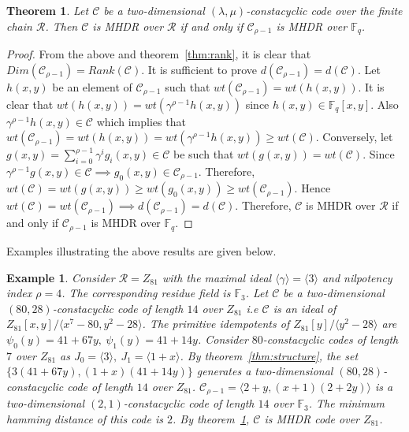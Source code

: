 \documentclass[12pt,a4paper]{article}
\newtheorem{theorem}{Theorem}[section]
\newtheorem{example}{Example}
\begin{document}
\begin{theorem}\label{thm:mhdr}
    Let $\mathscr{C}$ be a two-dimensional $(\lambda,\mu)$-constacyclic code over the finite chain $\mathcal{R}$. Then $\mathscr{C}$ is MHDR over $\mathcal{R}$ if and only if $\mathscr{C}_{\rho-1}$ is MHDR over $\mathbb{F}_q$.
\end{theorem}
\begin{proof}
    From the above and theorem~\ref{thm:rank}, it is clear that $Dim(\mathscr{C}_{\rho-1})= Rank(\mathscr{C})$. It is sufficient to prove $d(\mathscr{C}_{\rho-1})=d(\mathscr{C})$. Let $h(x,y)$ be an element of $\mathscr{C}_{\rho-1}$ such that $wt(\mathscr{C}_{\rho-1})=wt(h(x,y)).$ It is clear that $wt(h(x,y))=wt(\gamma^{\rho-1}h(x,y))$ since $h(x,y) \in \mathbb{F}_q[x,y]$. Also $\gamma^{\rho-1}h(x,y) \in \mathscr{C}$ which implies that $wt(\mathscr{C}_{\rho-1})=wt(h(x,y))=wt(\gamma^{\rho-1}h(x,y)) \geq wt(\mathscr{C}).$ Conversely, let $g(x,y)= \sum_{i=0}^{\rho-1}\gamma^i g_i(x,y) \in \mathscr{C}$ be such that $wt(g(x,y))=wt(\mathscr{C})$. Since $\gamma^{\rho-1}g(x,y) \in \mathscr{C} \implies g_0(x,y) \in \mathscr{C}_{\rho-1}$. Therefore, $wt(\mathscr{C})=wt(g(x,y)) \geq wt(g_0(x,y)) \geq wt(\mathscr{C}_{\rho-1})$. Hence $wt(\mathscr{C})=wt(\mathscr{C}_{\rho-1}) \implies d(\mathscr{C}_{\rho-1})=d(\mathscr{C}).$ Therefore, $\mathscr{C}$ is MHDR over $\mathcal{R}$ if and only if $\mathscr{C}_{\rho-1}$ is MHDR over $\mathbb{F}_q$.
\end{proof}
Examples illustrating the above results are given below.
\begin{example}
    Consider $\mathcal{R}=Z_{81}$ with the maximal ideal $\langle\gamma\rangle=\langle3\rangle$ and nilpotency index $\rho=4$. The corresponding residue field is $\mathbb{F}_3$. Let $\mathscr{C}$ be a two-dimensional $(80,28)$-constacyclic code of length $14$ over $Z_{81}$ i.e $\mathscr{C}$ is an ideal of $Z_{81}[x,y]/\langle x^7-80, y^2-28 \rangle$. The primitive idempotents of $Z_{81}[y]/\langle y^2-28 \rangle$ are $\psi_0(y)=41+67y,~ \psi_1(y)=41+14y$. Consider $80$-constacyclic codes of length $7$ over $Z_{81}$ as $J_0=\langle3\rangle, ~ J_1=\langle1+x\rangle$. By theorem~\ref{thm:structure}, the set $\{3(41+67y), (1+x)(41+14y) \}$ generates a two-dimensional $(80,28)$-constacyclic code of length $14$ over $Z_{81}$. $\mathcal{C}_{\rho-1}=\langle2+y,(x+1)(2+2y)\rangle$ is a two-dimensional $(2,1)$-constacyclic code of length $14$ over $\mathbb{F}_3$.
    The minimum hamming distance of this code is $2$. By theorem~\ref{thm:mhdr}, $\mathscr{C}$ is MHDR code over $Z_{81}$.
\end{example}
    
\end{document}
